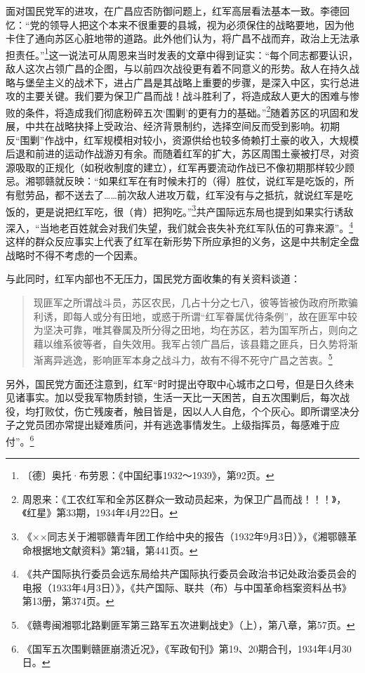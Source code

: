 面对国民党军的进攻，在广昌应否防御问题上，红军高层看法基本一致。李德回忆：“党的领导人把这个本来不很重要的县城，视为必须保住的战略要地，因为他卡住了通向苏区心脏地带的道路。此外他们认为，将广昌不战而弃，政治上无法承担责任。”\footnote{〔德〕奥托·布劳恩：《中国纪事1932～1939》，第92页。}这一说法可从周恩来当时发表的文章中得到证实：“每个同志都要认识，敌人这次占领广昌的企图，与以前四次战役更有着不同意义的形势。敌人在持久战略与堡垒主义的战术下，进占广昌是其战略上重要的步骤，是深入中区，实行总进攻的主要关键。我们要为保卫广昌而战！战斗胜利了，将造成敌人更大的困难与惨败的条件，将造成我们彻底粉碎五次‘围剿’的更有力的基础。”\footnote{周恩来：《工农红军和全苏区群众一致动员起来，为保卫广昌而战！！！》，《红星》第33期，1934年4月22日。}随着苏区的巩固和发展，中共在战略抉择上受政治、经济背景制约，选择空间反而受到影响。初期反“围剿”作战中，红军规模相对较小，资源供给也较多倚赖打土豪的收入，大规模后退和前进的运动作战游刃有余。而随着红军的扩大，苏区周围土豪被打尽，对资源吸取的正规化（如税收制度的建立），红军再要流动作战已不像初期那样较少顾忌。湘鄂赣就反映：“如果红军在有时候未打的（得）胜仗，说红军是吃饭的，所有慰劳品，都不送去了……前次敌人进攻万载，红军没有与之抵抗，就说红军是吃饭的，更是说把红军吃，很（肯）把狗吃。”\footnote{《××同志关于湘鄂赣青年团工作给中央的报告（1932年9月3日）》，《湘鄂赣革命根据地文献资料》第2辑，第441页。}共产国际远东局也提到如果实行诱敌深入，“当地老百姓就会对我们失望，我们就会丧失补充红军队伍的可靠来源”。\footnote{《共产国际执行委员会远东局给共产国际执行委员会政治书记处政治委员会的电报（1933年4月3日）》，《共产国际、联共（布）与中国革命档案资料丛书》第13册，第374页。}这样的群众反应事实上代表了红军在新形势下所应承担的义务，这是中共制定全盘战略时不得不考虑的一个因素。


与此同时，红军内部也不无压力，国民党方面收集的有关资料谈道：

\begin{quote}

现匪军之所谓战斗员，苏区农民，几占十分之七八，彼等皆被伪政府所欺骗利诱，即每人或分有田地，或惑于所谓“红军眷属优待条例”，故在匪军中较为坚决可靠，唯其眷属及所分得之田地，均在苏区，若为国军所占，则向之藉以维系彼等者，自失效用。我军占领广昌后，该县籍之匪兵，日久势将渐渐离异逃逸，影响匪军本身之战斗力，故有不得不死守广昌之苦衷。\footnote{《赣粤闽湘鄂北路剿匪军第三路军五次进剿战史》（上），第八章，第57页。}
\end{quote}


另外，国民党方面还注意到，红军“时时提出夺取中心城市之口号，但是日久终未见诸事实。加以受我军物质封锁，生活一天比一天困苦，自五次围剿后，每次战役，均打败仗，伤亡残废者，触目皆是，因以人人自危，个个灰心。即所谓坚决分子之党员团亦常提出疑难质问，并有逃逸事情发生。上级指挥员，每感难于应付”。\footnote{《国军五次围剿赣匪崩溃近况》，《军政旬刊》第19、20期合刊，1934年4月30日。}


